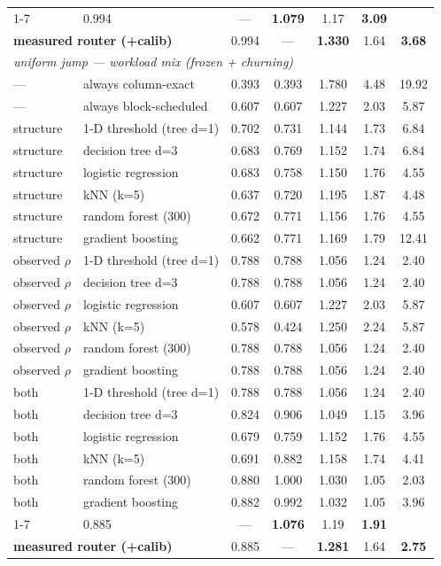 \begin{tabular}{llccccc}
\cmidrule(lr){1-7}
\multicolumn{2}{l}{\textbf{measured router (steady)}} & 0.994 & --- & \textbf{1.079} & 1.17 & \textbf{3.09} \\
\multicolumn{2}{l}{\textbf{measured router (+calib)}} & 0.994 & --- & \textbf{1.330} & 1.64 & \textbf{3.68} \\
\midrule
\multicolumn{7}{l}{\emph{uniform jump --- workload mix (frozen + churning)}}\\
\midrule
--- & always column-exact & 0.393 & 0.393 & 1.780 & 4.48 & 19.92 \\
--- & always block-scheduled & 0.607 & 0.607 & 1.227 & 2.03 & 5.87 \\
structure & 1-D threshold (tree d=1) & 0.702 & 0.731 & 1.144 & 1.73 & 6.84 \\
structure & decision tree d=3 & 0.683 & 0.769 & 1.152 & 1.74 & 6.84 \\
structure & logistic regression & 0.683 & 0.758 & 1.150 & 1.76 & 4.55 \\
structure & kNN (k=5) & 0.637 & 0.720 & 1.195 & 1.87 & 4.48 \\
structure & random forest (300) & 0.672 & 0.771 & 1.156 & 1.76 & 4.55 \\
structure & gradient boosting & 0.662 & 0.771 & 1.169 & 1.79 & 12.41 \\
observed $\rho$ & 1-D threshold (tree d=1) & 0.788 & 0.788 & 1.056 & 1.24 & 2.40 \\
observed $\rho$ & decision tree d=3 & 0.788 & 0.788 & 1.056 & 1.24 & 2.40 \\
observed $\rho$ & logistic regression & 0.607 & 0.607 & 1.227 & 2.03 & 5.87 \\
observed $\rho$ & kNN (k=5) & 0.578 & 0.424 & 1.250 & 2.24 & 5.87 \\
observed $\rho$ & random forest (300) & 0.788 & 0.788 & 1.056 & 1.24 & 2.40 \\
observed $\rho$ & gradient boosting & 0.788 & 0.788 & 1.056 & 1.24 & 2.40 \\
both & 1-D threshold (tree d=1) & 0.788 & 0.788 & 1.056 & 1.24 & 2.40 \\
both & decision tree d=3 & 0.824 & 0.906 & 1.049 & 1.15 & 3.96 \\
both & logistic regression & 0.679 & 0.759 & 1.152 & 1.76 & 4.55 \\
both & kNN (k=5) & 0.691 & 0.882 & 1.158 & 1.74 & 4.41 \\
both & random forest (300) & 0.880 & 1.000 & 1.030 & 1.05 & 2.03 \\
both & gradient boosting & 0.882 & 0.992 & 1.032 & 1.05 & 3.96 \\
\cmidrule(lr){1-7}
\multicolumn{2}{l}{\textbf{measured router (steady)}} & 0.885 & --- & \textbf{1.076} & 1.19 & \textbf{1.91} \\
\multicolumn{2}{l}{\textbf{measured router (+calib)}} & 0.885 & --- & \textbf{1.281} & 1.64 & \textbf{2.75} \\
\bottomrule
\end{tabular}
